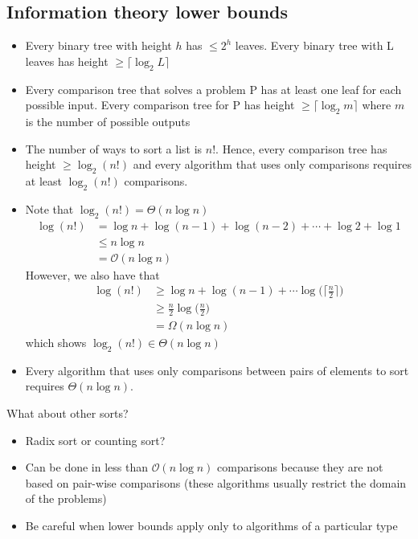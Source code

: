 \documentclass[11pt]{article}
\begin{document}
\subsection{Information theory lower bounds}
\begin{itemize}
    \item Every binary tree with height $h$ has $\leq 2^h$ leaves. Every binary tree with L leaves has height $\geq \lceil \log_2 L \rceil$
    
    \item Every comparison tree that solves a problem P has at least one leaf for each possible input. Every comparison tree for P has height $\geq \lceil \log_2 m \rceil$ where $m$ is the number of possible outputs
    
    \item The number of ways to sort a list is $n!$. Hence, every comparison tree has height $ \geq \log_2(n!)$ and every algorithm that uses only comparisons requires at least $\log_2 (n!)$ comparisons. 
    
    \item Note that $\log_2(n!) = \Theta(n \log n)$
    \begin{align*}
        \log(n!) &= \log n + \log(n-1) + \log(n-2) + \cdots + \log2 + \log 1 \\
        &\leq n \log n \\
        &= \mathcal{O}(n \log n) 
    \end{align*}
    However, we also have that 
    \begin{align*}
        \log(n!) &\geq \log n + \log(n-1) + \cdots \log\Big(\lceil \frac{n}{2}\rceil \Big) \\
        &\geq \frac{n}{2}\log\Big(\frac{n}{2}\Big) \\
        &= \Omega(n \log n)
    \end{align*}
    which shows $\log_2(n!) \in \Theta(n\log n)$
    
    \item Every algorithm that uses only  comparisons between pairs of elements to sort requires $\Theta(n \log n)$. 
\end{itemize}
What about other sorts?
\begin{itemize}
    \item Radix sort or counting sort?
    \item Can be done in less than $\mathcal{O}(n \log n)$ comparisons because they are not based on pair-wise comparisons (these algorithms usually restrict the domain of the problems) 
    \item Be careful when lower bounds apply only to algorithms of a particular type
    
\end{itemize}
\end{document}
